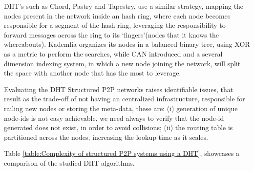 DHT's such as Chord\cite{Stoica2001}, Pastry\cite{Rowstron2001} and Tapestry\cite{Zhao2001}, use a similar strategy, mapping the nodes present in the network inside an hash ring, where each node becomes responsible for a segment of the hash ring, leveraging the responsibility to forward messages across the ring to its `fingers'(nodes that it knows the whereabouts). Kademlia\cite{Maymounkov} organizes its nodes in a balanced binary tree, using XOR as a metric to perform the searches, while CAN\cite{Handley} introduced and a several dimension indexing system, in which a new node joining the network, will split the space with another node that has the most to leverage.

Evaluating the DHT Structured P2P networks raises identifiable issues, that result as the trade-off of not having an centralized infrastructure, responsible for railing new nodes or storing the meta-data, these are: (i) generation of unique node-ids is not easy achievable, we need always to verify that the node-id generated does not exist, in order to avoid collisions; (ii) the routing table is partitioned across the nodes, increasing the lookup time as it scales.

Table \ref{table:Complexity of structured P2P systems using a DHT}, showcases a comparison of the studied DHT algorithms.

